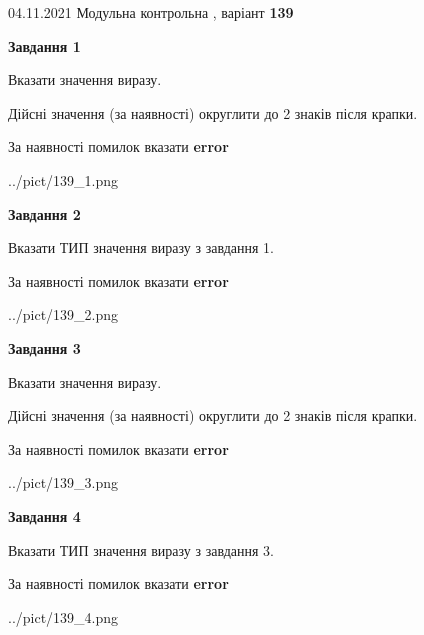 \documentclass[11pt, ukrainian]{article}
\begin{document}
{04.11.2021 Модульна контрольна , варіант  \No \textbf { 139 }\par}
{
\begin {large}
{\begin {center}\textbf{Завдання 1}\end {center}}\par
Вказати значення виразу. \par
Дійсні значення (за наявності) округлити до 2 знаків після крапки. \par
За наявності помилок вказати \textbf{error}

\begin{center}
	{../pict/139_1.png}
\end{center}
\newpage

{\begin {center}\textbf{Завдання 2}\end {center}}\par
Вказати ТИП значення виразу з завдання 1. \par
За наявності помилок вказати \textbf{error}

\begin{center}
	{../pict/139_2.png}
\end{center}
\newpage

{\begin {center}\textbf{Завдання 3}\end {center}}\par
Вказати значення виразу. \par
Дійсні значення (за наявності) округлити до 2 знаків після крапки. \par
За наявності помилок вказати \textbf{error}

\begin{center}
	{../pict/139_3.png}
\end{center}
\newpage

{\begin {center}\textbf{Завдання 4}\end {center}}\par
Вказати ТИП значення виразу з завдання 3. \par
За наявності помилок вказати \textbf{error}

\begin{center}
	{../pict/139_4.png}
\end{center}
\newpage


\end{large}}
\end{document}
